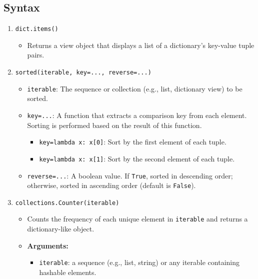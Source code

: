 \subsection{Syntax}
\begin{summary}

    \begin{enumerate}
        \item \texttt{dict.items()}
        \begin{itemize}
            \item Returns a view object that displays a list of a dictionary's key-value tuple pairs.
        \end{itemize}
        \item \texttt{sorted(iterable,\ key=...,\ reverse=...)}
        \begin{itemize}
            \item \texttt{iterable}: The sequence or collection (e.g., list, dictionary view) to be sorted.
            \item \texttt{key=...}: A function that extracts a comparison key from each element. Sorting is performed based on the result of this function.
            \begin{itemize}
                \item \texttt{key=lambda x: x[0]}: Sort by the first element of each tuple.
                \item \texttt{key=lambda x: x[1]}: Sort by the second element of each tuple.
            \end{itemize}
            \item \texttt{reverse=...}: A boolean value. If \texttt{True}, sorted in descending order; otherwise, sorted in ascending order (default is \texttt{False}).
        \end{itemize}
        \item \texttt{collections.Counter(iterable)}
        \begin{itemize}
            \item Counts the frequency of each unique element in \texttt{iterable} and returns a dictionary-like object.
            \item \textbf{Arguments:}
            \begin{itemize}
                \item \texttt{iterable}: a sequence (e.g., list, string) or any iterable containing hashable elements.
            \end{itemize}
        \end{itemize}
    \end{enumerate}

\end{summary}
\newpage

